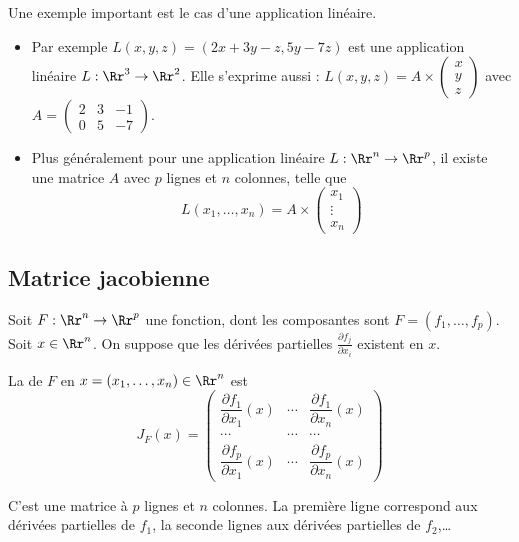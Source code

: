 \documentclass[12pt, class=report,crop=false]{standalone}
\begin{document}
\bigskip

Une exemple important est le cas d'une application linéaire.
\begin{itemize}
  \item Par exemple $L(x,y,z) = (2x+3y-z,5y-7z)$ est une application linéaire $L : \Rr^3 \to \Rr^2$. Elle s'exprime aussi :
$L(x,y,z) = A \times \left(\begin{smallmatrix} x \\ y \\ z \end{smallmatrix}\right)$ avec 
$A = \begin{pmatrix}
2&3&-1\\
0&5&-7
\end{pmatrix}$.

  \item Plus généralement pour une application linéaire 
$L : \Rr^n \to \Rr^p$, il existe une matrice $A$ avec $p$ lignes et $n$ colonnes, telle que 
$$L(x_1,\ldots,x_n) = A \times \begin{pmatrix}x_1\\\vdots\\x_n\end{pmatrix}$$
\end{itemize}




\subsection{Matrice jacobienne}

Soit $F : \Rr^n \to \Rr^p$ une fonction, dont les composantes sont
$F = (f_1,\ldots,f_p)$. Soit $x \in \Rr^n$. On suppose que les dérivées partielles
$\frac{\partial f_j}{\partial x_i}$ existent en $x$.

\begin{definition}
La  de $F$ en $x=(x_1,\ldots,x_n) \in \Rr^n$ est
$$
J_F(x) = 
\begin{pmatrix}
\dfrac{\partial f_1}{\partial x_1} (x) & \cdots & \dfrac{\partial f_1}{\partial x_n} (x) \\
\cdots & \cdots & \cdots \\
\dfrac{\partial f_p}{\partial x_1} (x) & \cdots & \dfrac{\partial f_p}{\partial x_n} (x)
\end{pmatrix}
$$
\end{definition}


C'est une matrice à $p$ lignes et $n$ colonnes.
La première ligne correspond aux dérivées partielles de $f_1$, la seconde lignes aux dérivées partielles de $f_2$,\ldots
\end{document}
